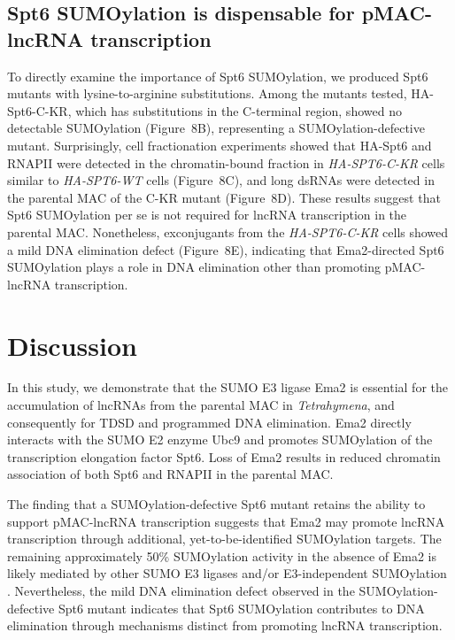 \documentclass[11pt]{article}
\begin{document}
\subsection{Spt6 SUMOylation is dispensable for pMAC-lncRNA transcription}

To directly examine the importance of Spt6 SUMOylation, we produced Spt6 mutants with lysine-to-arginine substitutions. Among the mutants tested, HA-Spt6-C-KR, which has substitutions in the C-terminal region, showed no detectable SUMOylation (Figure~8B), representing a SUMOylation-defective mutant. Surprisingly, cell fractionation experiments showed that HA-Spt6 and RNAPII were detected in the chromatin-bound fraction in \textit{HA-SPT6-C-KR} cells similar to \textit{HA-SPT6-WT} cells (Figure~8C), and long dsRNAs were detected in the parental MAC of the C-KR mutant (Figure~8D). These results suggest that Spt6 SUMOylation per se is not required for lncRNA transcription in the parental MAC. Nonetheless, exconjugants from the \textit{HA-SPT6-C-KR} cells showed a mild DNA elimination defect (Figure~8E), indicating that Ema2-directed Spt6 SUMOylation plays a role in DNA elimination other than promoting pMAC-lncRNA transcription.

\section{Discussion}

In this study, we demonstrate that the SUMO E3 ligase Ema2 is essential for the accumulation of lncRNAs from the parental MAC in \textit{Tetrahymena}, and consequently for TDSD and programmed DNA elimination. Ema2 directly interacts with the SUMO E2 enzyme Ubc9 and promotes SUMOylation of the transcription elongation factor Spt6. Loss of Ema2 results in reduced chromatin association of both Spt6 and RNAPII in the parental MAC.

The finding that a SUMOylation-defective Spt6 mutant retains the ability to support pMAC-lncRNA transcription suggests that Ema2 may promote lncRNA transcription through additional, yet-to-be-identified SUMOylation targets. The remaining approximately 50\% SUMOylation activity in the absence of Ema2 is likely mediated by other SUMO E3 ligases and/or E3-independent SUMOylation \citep{sampson2001}. Nevertheless, the mild DNA elimination defect observed in the SUMOylation-defective Spt6 mutant indicates that Spt6 SUMOylation contributes to DNA elimination through mechanisms distinct from promoting lncRNA transcription.
\end{document}
